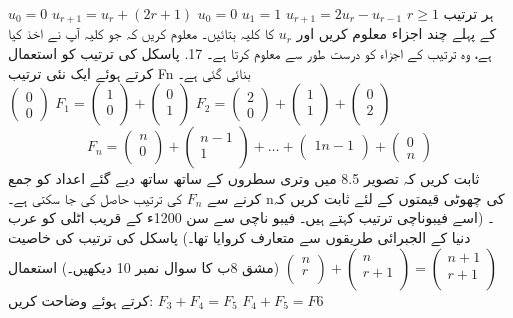 \(u_{0}=0\) 
\(u_{r+1}=u_{r}+(2r+1)\)
\(u_{0}=0\)
\(u_{1}=1\)
\(u_{r+1}=2u_{r}-u_{r-1}\)
\(r\ge 1\)
ہر ترتیب کے پہلے چند اجزاء معلوم کریں اور
\(u_{r}\)
 کا کلیہ بتائیں۔ معلوم کریں کہ جو کلیہ آپ نے اخذ کیا ہے، وہ ترتیب کے اجزاء کو درست طور سے معلوم کرتا ہے۔
17.	پاسکل کی ترتیب کو استعمال کرتے ہوئے ایک نئی ترتیب Fn بنائی گئی ہے۔\\
\(
\begin{pmatrix}
0\\
0
\end{pmatrix}\)
\(F_{1}=
\begin{pmatrix}
1\\
0\\
\end{pmatrix}
+
\begin{pmatrix}
0\\
1\\
\end{pmatrix}\)
\(F_{2}=
\begin{pmatrix}
2\\
0
\end{pmatrix}
+
\begin{pmatrix}
1\\
1\\
\end{pmatrix}
+
\begin{pmatrix}
0\\
2\\
\end{pmatrix}\)
\[F_{n}=
\begin{pmatrix}
n\\
0\\

\end{pmatrix}
+
\begin{pmatrix}
n-1\\
1\\
\end{pmatrix}
+\dotsc +
\begin{pmatrix}
1
n-1\\
\end{pmatrix}
+
\begin{pmatrix}
0\\
n
\end{pmatrix}\] 
ثابت کریں کہ تصویر 8.5 میں وتری سطروں کے ساتھ ساتھ دیے گئے اعداد کو جمع کرنے سے
 \(F_{n}\)
  کی ترتیب حاصل کی جا سکتی ہے۔ nکی چھوٹی قیمتوں کے لئے ثابت کریں کہ 	۔ (اسے فیبوناچی ترتیب کہتے ہیں۔ فیبو ناچی سے سن 1200ء کے قریب اٹلی کو عرب دنیا کے الجبرائی طریقوں سے متعارف کروایا تھا۔)
پاسکل کی ترتیب کی خاصیت 
\(
\begin{pmatrix}
n\\
r\\
\end{pmatrix}
+
\begin{pmatrix}
n\\
r+1\\
\end{pmatrix}
=
\begin{pmatrix}
n+1\\
r+1\\
\end{pmatrix}\)
(مشق 8ب کا سوال نمبر 10 دیکھیں۔) استعمال کرتے ہوئے وضاحت کریں:
\(F_{3}+F_{4}=F_{5}\)
\(F_{4}+F_{5}=F{6}\)

